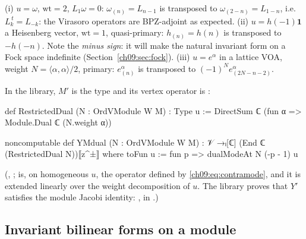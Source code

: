 \begin{example}\label{ch09:ex:contra}
(i) $u=\omega$, $\mathrm{wt}=2$, $L_1\omega=0$: $\omega_{(n)}=L_{n-1}$ is transposed to
$\omega_{(2-n)}=L_{1-n}$, i.e.\ $L_k^{\,t}=L_{-k}$: the Virasoro operators are BPZ-adjoint as
expected. (ii) $u=h(-1)\mathbf 1$ a Heisenberg vector, $\mathrm{wt}=1$, quasi-primary:
$h_{(n)}=h(n)$ is transposed to $-h(-n)$. Note the \emph{minus sign}: it will make the natural
invariant form on a Fock space indefinite (Section~\ref{ch09:sec:fock}). (iii) $u=e^\alpha$ in a
lattice VOA, weight $N=\langle\alpha,\alpha\rangle/2$, primary: $e^\alpha_{(n)}$ is transposed to
$(-1)^Ne^\alpha_{(2N-n-2)}$.
\end{example}

In the library, $M'$ is the type  and its vertex operator is
:
\begin{leancode}
def RestrictedDual (N : OrdVModule W M) : Type u := DirectSum ℂ (fun α => Module.Dual ℂ (N.weight α))

noncomputable def YMdual (N : OrdVModule W M) : 𝒱 →ₗ[ℂ] (End ℂ (RestrictedDual N))⟦z^±⟧ where
  toFun u := fun p => dualModeAt N (-p - 1) u
\end{leancode}
(, ;
 is, on homogeneous $u$, the operator defined by \eqref{ch09:eq:contramode},
and it is extended linearly over the weight decomposition of $u$. The library proves that $Y'$
satisfies the module Jacobi identity: , in
.)

\subsection{Invariant bilinear forms on a module}

